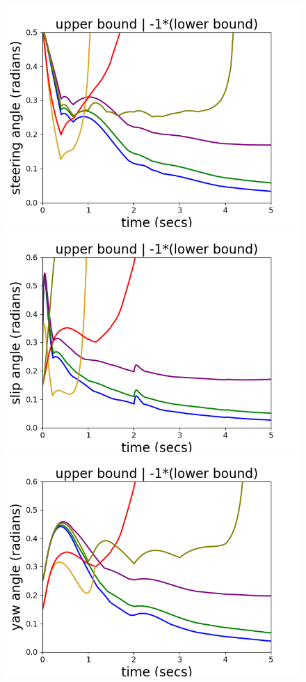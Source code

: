 \begin{figure}
\includegraphics[scale = 0.41]{autocarImages/ubToolSteering.png}\hspace{-2.2em}
\includegraphics[scale = 0.41]{autocarImages/ubToolSlip.png}
\includegraphics[scale = 0.41]{autocarImages/ubToolYaw.png}\hspace{-2.2em}

\end{figure}
